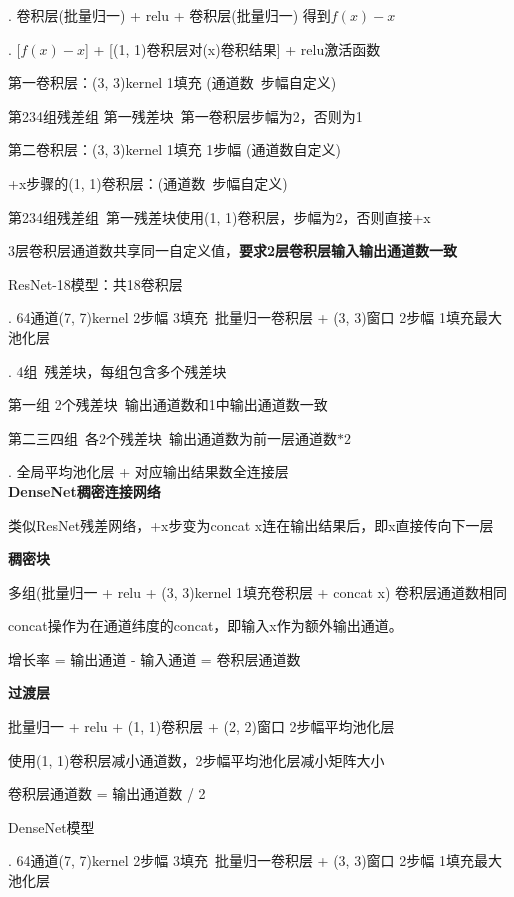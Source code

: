 \documentclass[UTF8]{ctexart}
\begin{document}
  . 卷积层(批量归一) + relu + 卷积层(批量归一) 得到$f(x) - x$
  
  . [$f(x) - x$] + [(1, 1)卷积层对(x)卷积结果] + relu激活函数
  
  \quad \quad 第一卷积层：(3, 3)kernel 1填充 (通道数\ 步幅自定义)

  \quad \quad \quad 第234组残差组 第一残差块\ 第一卷积层步幅为2，否则为1

  \quad \quad 第二卷积层：(3, 3)kernel 1填充 1步幅 (通道数自定义)

  \quad \quad +x步骤的(1, 1)卷积层：(通道数\ 步幅自定义) 

  \quad \quad \quad 第234组残差组\ 第一残差块使用(1, 1)卷积层，步幅为2，否则直接+x

  \quad \quad 3层卷积层通道数共享同一自定义值，\textbf{要求2层卷积层输入输出通道数一致}

  ResNet-18模型：共18卷积层

  . 64通道(7, 7)kernel 2步幅 3填充\ 批量归一卷积层 + (3, 3)窗口 2步幅 1填充最大池化层

  . 4组\ 残差块，每组包含多个残差块

  \quad \quad 第一组 2个残差块\ 输出通道数和1中输出通道数一致
  
  \quad \quad 第二三四组\ 各2个残差块\ 输出通道数为前一层通道数$*2$

  . 全局平均池化层 + 对应输出结果数全连接层\\
\textbf{DenseNet稠密连接网络}

  类似ResNet残差网络，+x步变为concat x连在输出结果后，即x直接传向下一层

  \textbf{稠密块}

  \quad 多组(批量归一 + relu + (3, 3)kernel 1填充卷积层 + concat x) 卷积层通道数相同

  \quad concat操作为在通道纬度的concat，即输入x作为额外输出通道。

  \quad 增长率 = 输出通道 - 输入通道 = 卷积层通道数

  \textbf{过渡层}

  \quad 批量归一 + relu + (1, 1)卷积层 + (2, 2)窗口 2步幅平均池化层
  
  \quad 使用(1, 1)卷积层减小通道数，2步幅平均池化层减小矩阵大小

  \quad \quad 卷积层通道数 = 输出通道数 / 2

  DenseNet模型

  . 64通道(7, 7)kernel 2步幅 3填充\ 批量归一卷积层 + (3, 3)窗口 2步幅 1填充最大池化层
\end{document}
